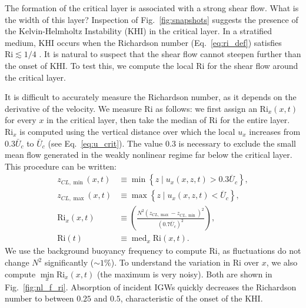 \documentclass[
        fleqn,
        usenatbib,
    ]{mnras}
\newcommand*{\p}[1]{\left(#1\right)}
\newcommand*{\z}[1]{\left\{#1\right\}}
\DeclareMathOperator*{\med}{med}
\begin{document}
The formation of the critical layer is associated with a strong shear flow. What
is the width of this layer? Inspection of Fig.~\ref{fig:snapshots} suggests the
presence of the Kelvin-Helmholtz Instability (KHI) in the
critical layer. In a stratified medium, KHI occurs when the Richardson number
(Eq.~\eqref{eq:ri_def}) satisfies $\mathrm{Ri} \lesssim 1/4$
\citep[e.g.][]{shu1991physics}. It is natural to suspect that the shear flow
cannot steepen further than the onset of KHI\@. To test this, we compute the
local $\mathrm{Ri}$ for the shear flow around the critical layer.

It is difficult to accurately measure the Richardson number, as it depends on
the derivative of the velocity. We measure $\mathrm{Ri}$ as follows: we first
assign an $\mathrm{Ri}_x(x, t)$ for every $x$ in the critical layer, then take
the median of $\mathrm{Ri}$ for the entire layer. $\mathrm{Ri}_x$ is computed
using the vertical distance over which the local $u_x$ increases from
$0.3\bar{U}_c$ to $\bar{U}_c$ (see Eq.~\eqref{eq:u_crit}). The value $0.3$ is
necessary to exclude the small mean flow generated in the weakly nonlinear
regime far below the
critical layer. This procedure can be written:
\begin{align}
    z_{CL, \min}(x, t) &\equiv \min
        \z{z\mid u_x(x, z, t) > 0.3\overline{U}_c},\\
    z_{CL, \max}(x, t) &\equiv \max
        \z{z\mid u_x(x, z, t) < \overline{U}_c},\\
    \mathrm{Ri}_x(x, t) &\equiv
        \p{\frac{N^2 \p{z_{CL, \max} - z_{CL, \min}}^2}{(0.7
            \overline{U}_c)^2}},\\
    \mathrm{Ri}(t) &\equiv \med_x\mathrm{Ri}\p{x, t}.\label{eq:ri_med_def}
\end{align}
We use the background buoyancy frequency to compute $\mathrm{Ri}$, as
fluctuations do not change $N^2$ significantly ($\sim 1\%$). To understand the
variation in $\mathrm{Ri}$ over $x$, we also compute $\min\limits_x
\mathrm{Ri}_x(x, t)$ (the maximum is very noisy). Both are shown in
Fig.~\ref{fig:nl_f_ri}. Absorption of incident IGWs quickly
decreases the Richardson number to between $0.25$ and $0.5$, characteristic of
the onset of the KHI\@.
\end{document}
